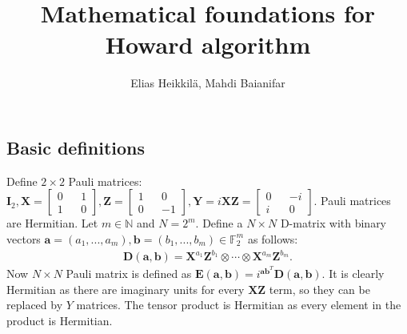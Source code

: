 \documentclass{article}
\title{Mathematical foundations for Howard algorithm}
\author{Elias Heikkilä, Mahdi Baianifar}
\date{}
\begin{document}
\maketitle
\subsection*{Basic definitions}
Define $2 \times 2$ Pauli matrices: $\mathbf{I}_2, \mathbf{X} = \begin{bmatrix} 0 && 1 \\ 1 && 0 \end{bmatrix}, \mathbf{Z} = \begin{bmatrix} 1 && 0 \\ 0 && -1 \end{bmatrix}, \mathbf{Y} = i\mathbf{X}\mathbf{Z} = \begin{bmatrix} 0 && -i \\ i && 0 \end{bmatrix}$. Pauli matrices are Hermitian.
	Let $m \in \mathbb{N}$ and $N = 2^m$. Define a $N \times N$ D-matrix with binary vectors $\mathbf{a} = (a_1, ..., a_m), \mathbf{b} = (b_1,..., b_m) \in \mathbb{F}_2^m$ as follows:
	\begin{align*}
		\mathbf{D}(\mathbf{a}, \mathbf{b}) = \mathbf{X}^{a_1}\mathbf{Z}^{b_1} \otimes \cdots \otimes \mathbf{X}^{a_m}\mathbf{Z}^{b_m}.
	\end{align*}
	Now $N \times N$ Pauli matrix is defined as $\mathbf{E}(\mathbf{a}, \mathbf{b}) = i^{\mathbf{a}\mathbf{b}^T}\mathbf{D}(\mathbf{a}, \mathbf{b})$. It is clearly Hermitian as there are imaginary units for every $\mathbf{XZ}$ term, so they can be replaced by $Y$ matrices. The tensor product is Hermitian as every element in the product is Hermitian.
\end{document}
